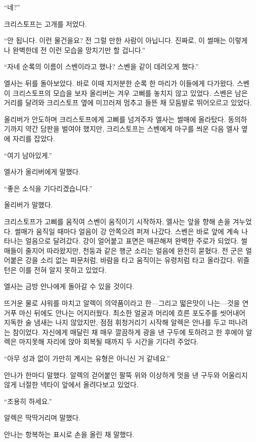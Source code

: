 ``네?''

크리스토프는 고개를 저었다.

``안 됩니다. 이런 물건을요? 전 그럴 만한 사람이 아닙니다. 진짜로, 이 썰매는 이렇게나 완벽한데 전 이런 모습을 망치기만 할 겁니다.''

``자네 순록의 이름이 스벤이라고 했나? 스벤을 같이 데려오게 했다.''

엘사는 뒤를 돌아보았다. 바로 이때 지저분한 순록 한 마리가 이들에게 다가왔다. 스벤이 크리스토프의 모습을 보자 올리버는 겨우 고삐를 놓치지 않고 있었다. 스벤은 남은 거리를 달려와 크리스토프 옆에 미끄러져 멈추고 들뜬 채 모둠발로 뛰어오르고 있었다.

올리버가 안도하며 크리스토프에게 고삐를 넘겨주자 엘사는 썰매에 올라탔다. 동의하기까지 약간 담판을 벌여야 했지만, 크리스토프는 스벤에게 마구를 씌운 다음 엘사 옆에 자리를 잡았다.

``여기 남아있게.''

엘사가 올리버에게 말했다.

``좋은 소식을 기다리겠습니다.''

올리버가 말했다.

크리스토프가 고삐를 움직여 스벤이 움직이기 시작하자, 엘사는 앞을 향해 손을 겨누었다. 썰매가 움직일 때마다 얼음이 강 안쪽으려 퍼져 나갔다. 스벤은 바로 앞에 계속 나타나는 얼음으로 달려갔다. 강이 얼어붙고 표면은 매끈해져 완벽한 주로가 되었다. 썰매들이 줄지어 따라왔지만, 천둥과 같은 행군 소리는 얼음에 완전히 묻혔다. 전 군은 얼어붙은 강을 소리 없는 파문처럼, 바람을 타고 움직이는 유령처럼 타고 올라갔다. 위즐턴은 이를 전혀 알지 못하고 있었다.

엘사는 금방 안나에게 돌아갈 수 있을 것이다.

\textbreak

뜨거운 물로 샤워를 마치고 알렉이 의약품이라고 한—그리고 떫은맛이 나는—것을 연거푸 마신 뒤에도 안나는 어지러웠다. 최소한 얼굴과 머리에 흐른 포도주를 씻어내어 지독한 술 냄새는 나지 않았지만, 점점 휘청거리기 시작해 알렉은 안나를 두고 떠나려는 참이었다. 자신에게 매달린 채 매우 깔끔하게 광을 낸 구두에 토하려고 한 후에야 알렉은 마지못해 자리에 앉아 회복될 때까지 두 시간을 기다려 주었다.

``아무 성과 없이 가만히 계시는 유형은 아니신 거 같네요.''

안나가 한마디 말했다. 알렉의 걷어붙인 팔뚝 위와 이상하게 멋을 낸 구두와 어울리지 않게 너절한 넥타이 앞에서 올려다보고 있었다.

``조용히 하세요.''

알렉은 딱딱거리며 말했다.

안나는 항복하는 표시로 손을 올린 채 말했다.

